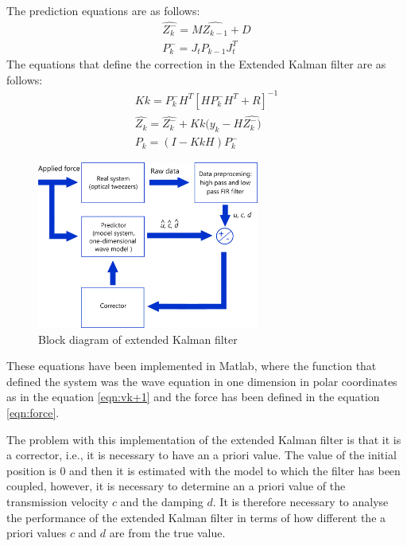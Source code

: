 \documentclass[12pt, a4paper]{article} %
\begin{document}
The prediction equations are as follows:
\setlength{\parskip}{4mm}
\begin{equation} \label{eqn:predictor}
    \begin{array}{ l }

    \hat{Z_{k}^{-}} = M\hat{Z_{k-1}} + D \\
    P_{k}^{-} = J_{t}P_{k-1}J_{t}^{T}
    
    \end{array}
\end{equation}
The equations that define the correction in the Extended Kalman filter are as follows:
\begin{equation} \label{eqn:corrector}
	\begin{array}{ l }
		
		Kk = P_{k}^{-}H^{T}[HP_{k}^{-}H^{T} + R]^{-1} \\
		\hat{Z_{k}} = \hat{Z_{k}^{-}} + Kk(y_{k}-H\hat{Z_{k}^{-})} \\
		P_{k} = (I - KkH)P_{k}^{-}
		
	\end{array}
\end{equation}
\begin{figure}[h!]
	\centering
	\includegraphics[width=0.65\textwidth]{figures/esquema_extended_kalman_filter.png}
	\caption{Block diagram of extended Kalman filter}
	\label{fig:kalman_esq}
\end{figure}

\newpage

These equations have been implemented in Matlab, where the function that defined the system was the wave equation in one dimension in polar coordinates as in the equation \ref{eqn:vk+1} and the force has been defined in the equation \ref{eqn:force}. 

The problem with this implementation of the extended Kalman filter is that it is a corrector, i.e., it is necessary to have an a priori value. The value of the initial position is 0 and then it is estimated with the model to which the filter has been coupled, however, it is necessary to determine an a priori value of the transmission velocity $c$ and the damping $d$. It is therefore necessary to analyse the performance of the extended Kalman filter in terms of how different the a priori values $c$ and $d$ are from the true value.
\end{document}
